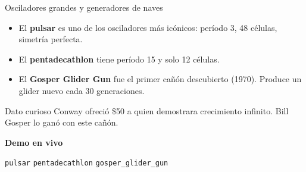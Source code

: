 \documentclass[10pt,aspectratio=169]{beamer}
\newcommand{\demo}[1]{\textcolor{democolor}{\texttt{#1}}}
\begin{document}
\begin{frame}{Osciladores grandes y generadores de naves}

  \vspace{0.4cm}

  \begin{itemize}
    \item El \textbf{pulsar} es uno de los osciladores más icónicos:
          período 3, 48 células, simetría perfecta.
    \item El \textbf{pentadecathlon} tiene período 15 y solo 12 células.
    \item El \textbf{Gosper Glider Gun} fue el primer cañón descubierto
          (1970). Produce un glider nuevo cada 30 generaciones.
  \end{itemize}

  \begin{alertblock}{Dato curioso}
    Conway ofreció \$50 a quien demostrara crecimiento infinito.
    Bill Gosper lo ganó con este cañón.
  \end{alertblock}

  \vspace{0.3cm}

  \begin{center}
    \textbf{Demo en vivo}

    \demo{pulsar} \quad \demo{pentadecathlon} \quad \demo{gosper\_glider\_gun}
  \end{center}
\end{frame}
\end{document}
